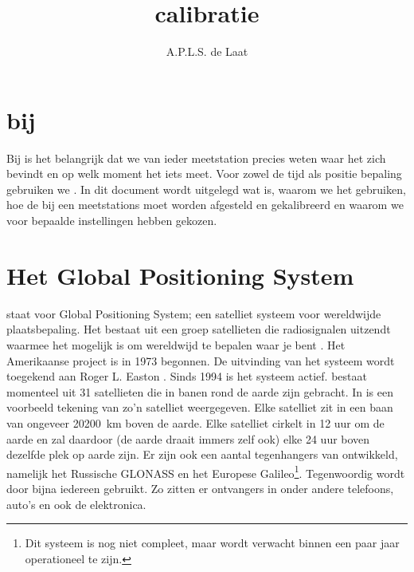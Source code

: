

\title{\gps calibratie}
\author{A.P.L.S. de Laat}



\maketitle

\section{\gps bij \hisparc}\label{sec:gps_hisparc}

Bij \hisparc is het belangrijk dat we van ieder meetstation precies weten waar
het zich bevindt en op welk moment het iets meet. Voor zowel de
tijd als positie bepaling gebruiken we \gps. In dit document wordt
uitgelegd wat \gps is, waarom we het gebruiken, hoe de \gps bij een
\hisparc meetstations moet worden afgesteld en gekalibreerd en waarom we
voor bepaalde instellingen hebben gekozen.


\section{Het Global Positioning System}\label{sec:gps}

\gps staat voor Global Positioning System; een satelliet systeem voor
wereldwijde plaatsbepaling. Het bestaat uit een groep satellieten die
radiosignalen uitzendt waarmee het mogelijk is om wereldwijd te bepalen
waar je bent \cite{gps2013gov}. Het Amerikaanse project is in 1973
begonnen. De uitvinding van het systeem wordt toegekend aan Roger L.
Easton \cite{easton2006who}. Sinds 1994 is het systeem actief. \gps
bestaat momenteel uit 31 satellieten die in banen rond de aarde zijn
gebracht. In  is een voorbeeld tekening van
zo'n \gps satelliet weergegeven. Elke \gps satelliet zit in een baan van
ongeveer \SI{20200}{\kilo\meter} boven de aarde. Elke satelliet cirkelt
in 12 uur om de aarde en zal daardoor (de aarde draait immers zelf ook)
elke 24 uur boven dezelfde plek op aarde zijn. Er zijn ook een aantal
tegenhangers van \gps ontwikkeld, namelijk het Russische GLONASS en het
Europese Galileo\footnote{Dit systeem is nog niet compleet, maar wordt
verwacht binnen een paar jaar operationeel te zijn.}. Tegenwoordig wordt
\gps door bijna iedereen gebruikt. Zo zitten er \gps ontvangers in onder
andere telefoons, auto's en ook de \hisparc elektronica.

